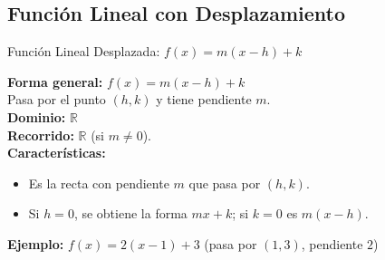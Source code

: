 \documentclass[12pt,a4paper]{article}
\begin{document}
\subsection{Función Lineal con Desplazamiento}
\begin{funcbox}{Función Lineal Desplazada: $f(x)=m(x-h)+k$}
\begin{minipage}[t]{0.55\textwidth}
    \textbf{Forma general:} $f(x)=m(x-h)+k$\\
    Pasa por el punto $(h,k)$ y tiene pendiente $m$.\\
    \textbf{Dominio:} $\mathbb{R}$\\
    \textbf{Recorrido:} $\mathbb{R}$ (si $m\neq0$).\\
    \textbf{Características:}
    \begin{itemize}
        \item Es la recta con pendiente $m$ que pasa por $(h,k)$.
        \item Si $h=0$, se obtiene la forma $mx+k$; si $k=0$ es $m(x-h)$.
    \end{itemize}
    \textbf{Ejemplo:} $f(x)=2(x-1)+3$ (pasa por $(1,3)$, pendiente $2$)
\end{minipage}\hfill
\begin{minipage}[t]{0.4\textwidth}
    \centering
\end{minipage}
\end{funcbox}

\end{document}

